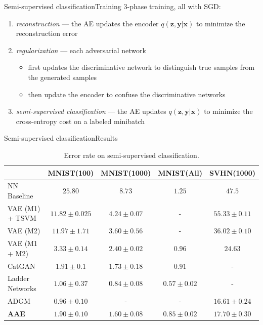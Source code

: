 \documentclass[10pt]{beamer}
\newcommand{\vect}[1]{\boldsymbol{#1}} %
\begin{document}
\begin{frame}{Semi-supervised classification}{Training}
3-phase training, all with SGD:
\begin{enumerate}
  \item \textit{reconstruction} — the AE updates the encoder $ q(\vect z, \vect y | \vect x) $ to minimize the reconstruction error
  \item \textit{regularization} — each adversarial network
  \begin{itemize}
    \item first updates the discriminative network to distinguish true samples from the generated samples
    \item then update the encoder to confuse the discriminative networks
  \end{itemize}
  \item \textit{semi-supervised classification} — the AE updates $ q(\vect z, \vect y | \vect x) $ to minimize the cross-entropy cost on a labeled minibatch
\end{enumerate}
\end{frame}

\begin{frame}{Semi-supervised classification}{Results}
\begin{table}
  \centering
  \scriptsize
    \begin{tabular}{l||c|c|c||c}
    	\toprule
    	                &     MNIST(100)      &    MNIST(1000)    &    MNIST(All)     &     SVHN(1000)     \\ \midrule
    	NN Baseline     &      $ 25.80 $      &     $ 8.73 $      &     $ 1.25 $      &      $ 47.5 $      \\ \midrule
    	VAE (M1) + TSVM & $ 11.82 \pm 0.025 $ & $ 4.24 \pm 0.07 $ &         -         & $ 55.33 \pm 0.11 $ \\
    	VAE (M2)        & $ 11.97 \pm 1.71 $  & $ 3.60 \pm 0.56 $ &         -         & $ 36.02 \pm 0.10 $ \\
    	VAE (M1 + M2)   &  $ 3.33 \pm 0.14 $  & $ 2.40 \pm 0.02 $ &     $ 0.96 $      &     $ 24.63 $      \\
    	CatGAN          &  $ 1.91 \pm 0.1 $   & $ 1.73 \pm 0.18 $ &     $ 0.91 $      &         -          \\
    	Ladder Networks &  $ 1.06 \pm 0.37 $  & $ 0.84 \pm 0.08 $ & $ 0.57 \pm 0.02 $ &         -          \\
    	ADGM            &  $ 0.96 \pm 0.10 $  &         -         &         -         & $ 16.61 \pm 0.24 $ \\ \midrule
    	\textbf{AAE}    &  $ 1.90 \pm 0.10 $  & $ 1.60 \pm 0.08 $ & $ 0.85 \pm 0.02 $ & $ 17.70 \pm 0.30 $ \\ \bottomrule
    \end{tabular}
  \caption{Error rate on semi-supervised classification.}
\end{table}
\end{frame}
\end{document}
